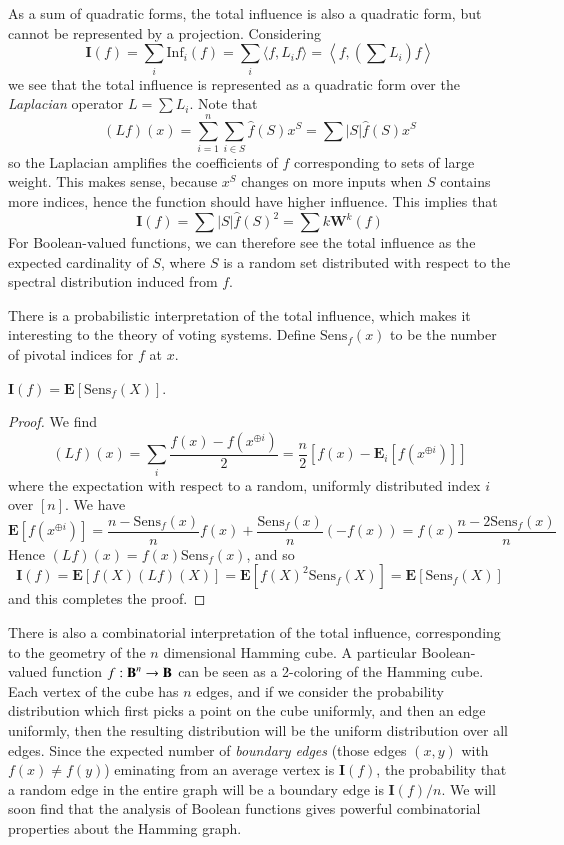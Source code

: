 As a sum of quadratic forms, the total influence is also a quadratic form, but cannot be represented by a projection. Considering
%
\[ \mathbf{I}(f) = \sum_i \text{Inf}_i(f) = \sum_i \langle f, L_i f \rangle = \left\langle f, \left( \sum L_i \right) f \right\rangle \]
%
we see that the total influence is represented as a quadratic form over the \emph{Laplacian} operator $L = \sum L_i$. Note that
%
\[ (Lf)(x) = \sum_{i = 1}^n \sum_{i \in S} \widehat{f}(S) x^S = \sum |S| \widehat{f}(S) x^S \]
%
so the Laplacian amplifies the coefficients of $f$ corresponding to sets of large weight. This makes sense, because $x^S$ changes on more inputs when $S$ contains more indices, hence the function should have higher influence. This implies that
%
\[ \mathbf{I}(f) = \sum |S| \widehat{f}(S)^2 = \sum k \mathbf{W}^k(f) \]
%
For Boolean-valued functions, we can therefore see the total influence as the expected cardinality of $S$, where $S$ is a random set distributed with respect to the spectral distribution induced from $f$.

There is a probabilistic interpretation of the total influence, which makes it interesting to the theory of voting systems. Define $\text{Sens}_f(x)$ to be the number of pivotal indices for $f$ at $x$.

\begin{theorem} $\mathbf{I}(f) = \mathbf{E}[\text{Sens}_f(X)]$. \end{theorem}
\begin{proof}
    We find
    \[ (Lf)(x) = \sum_i \frac{f(x) - f(x^{\oplus i})}{2} = \frac{n}{2} [f(x) - \mathbf{E}_i[f(x^{\oplus i})]] \]
    where the expectation with respect to a random, uniformly distributed index $i$ over $[n]$. We have
    \[ \mathbf{E}[f(x^{\oplus i})] = \frac{n - \text{Sens}_f(x)}{n} f(x) + \frac{\text{Sens}_f(x)}{n} (-f(x)) = f(x) \frac{n - 2 \text{Sens}_f(x)}{n} \]
    Hence $(Lf)(x) = f(x) \text{Sens}_f(x)$, and so
    \[ \mathbf{I}(f) = \mathbf{E}[f(X) (Lf)(X)] = \mathbf{E}[f(X)^2 \text{Sens}_f(X)] = \mathbf{E}[\text{Sens}_f(X)] \]
    and this completes the proof.
\end{proof}

There is also a combinatorial interpretation of the total influence, corresponding to the geometry of the $n$ dimensional Hamming cube. A particular Boolean-valued function $f: \operatorname{\mathbf{B}}^n \to \operatorname{\mathbf{B}}$ can be seen as a 2-coloring of the Hamming cube. Each vertex of the cube has $n$ edges, and if we consider the probability distribution which first picks a point on the cube uniformly, and then an edge uniformly, then the resulting distribution will be the uniform distribution over all edges. Since the expected number of \emph{boundary edges} (those edges $(x,y)$ with $f(x) \neq f(y)$) eminating from an average vertex is $\mathbf{I}(f)$, the probability that a random edge in the entire graph will be a boundary edge is $\mathbf{I}(f)/n$. We will soon find that the analysis of Boolean functions gives powerful combinatorial properties about the Hamming graph.

